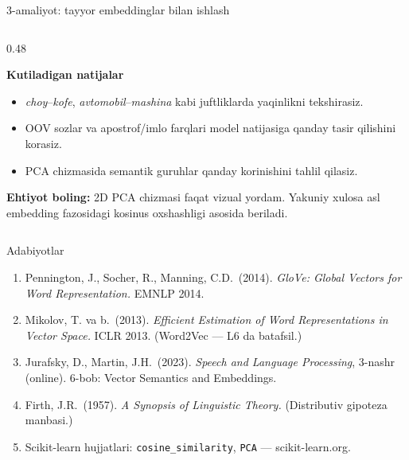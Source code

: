 \documentclass[aspectratio=169,11pt]{beamer}
\begin{document}
\begin{frame}{3-amaliyot: tayyor embeddinglar bilan ishlash}
\begin{columns}[T,totalwidth=\textwidth]
\begin{column}{0.48\textwidth}

\textbf{Kutiladigan natijalar}

\begin{itemize}\setlength\itemsep{5pt}
  \item \textit{choy}--\textit{kofe}, \textit{avtomobil}--\textit{mashina}
        kabi juftliklarda yaqinlikni tekshirasiz.
  \item OOV so\textquotesingle{}zlar va apostrof/imlo farqlari model natijasiga
        qanday ta\textquotesingle{}sir qilishini ko\textquotesingle{}rasiz.
  \item PCA chizmasida semantik guruhlar qanday ko\textquotesingle{}rinishini
        tahlil qilasiz.
\end{itemize}

\vspace{4pt}

\begin{tcolorbox}[alertbox,left=2mm,right=2mm,top=1mm,bottom=1mm]
\scriptsize
\textbf{Ehtiyot bo\textquotesingle{}ling:} 2D PCA chizmasi faqat vizual yordam.
Yakuniy xulosa asl embedding fazosidagi kosinus o\textquotesingle{}xshashligi
asosida beriladi.
\end{tcolorbox}

\end{column}
\end{columns}

\end{frame}

\begin{frame}{Adabiyotlar}
  \begin{enumerate}\small\setlength\itemsep{6pt}
    \item Pennington, J., Socher, R., Manning, C.D.\ (2014).
          \textit{GloVe: Global Vectors for Word Representation.}
          EMNLP 2014.
    \item Mikolov, T. va b.\ (2013).
          \textit{Efficient Estimation of Word Representations in
          Vector Space.} ICLR 2013. (Word2Vec --- L6 da batafsil.)
    \item Jurafsky, D., Martin, J.H.\ (2023).
          \textit{Speech and Language Processing}, 3-nashr (online).
          6-bob: Vector Semantics and Embeddings.
    \item Firth, J.R.\ (1957). \textit{A Synopsis of Linguistic Theory.}
          (Distributiv gipoteza manbasi.)
    \item Scikit-learn hujjatlari: \texttt{cosine\_similarity},
          \texttt{PCA} --- scikit-learn.org.
  \end{enumerate}
\end{frame}
\end{document}
